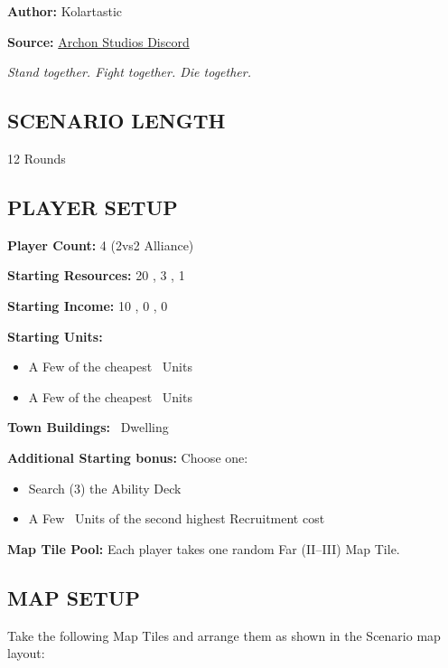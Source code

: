 
\begin{multicols*}{2}

\textbf{Author:} Kolartastic

\textbf{Source:} \href{https://discord.com/channels/740870068178649108/1161571991732625468/threads/1164804609605390386}{Archon Studios Discord}

\textit{Stand together. Fight together. Die together.}  %

\subsection*{\MakeUppercase{Scenario Length}}
12 Rounds

\subsection*{\MakeUppercase{Player Setup}}
\textbf{Player Count:} 4 (2vs2 Alliance)

\textbf{Starting Resources:} 20 , 3 , 1 

\textbf{Starting Income:} 10 , 0 , 0 

\textbf{Starting Units:}

\begin{itemize}
  \item A Few of the cheapest \bronze\ Units
  \item A Few of the cheapest \silver\ Units
\end{itemize}

\textbf{Town Buildings:} \bronze\ Dwelling

\textbf{Additional Starting bonus:}
Choose one:
\begin{itemize}
  \item Search (3) the Ability Deck
  \item A Few \bronze\ Units of the second highest Recruitment cost
\end{itemize}

\textbf{Map Tile Pool:} Each player takes one random Far (II–III) Map Tile.

\subsection*{\MakeUppercase{Map Setup}}
Take the following Map Tiles and arrange them as shown in the Scenario map layout:


\end{multicols*}

